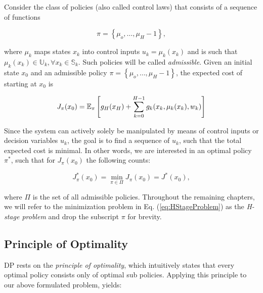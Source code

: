 Consider the class of policies (also called control laws) that consists of a
sequence of functions 

\begin{equation}
  \pi = \left\{\mu_o,\dots,\mu_H-1\right\},
\end{equation}

where $\mu_k$ maps states $x_k$ into control inputs $u_k = \mu_k(x_k)$ and is
such that $\mu_k(x_k) \in \mathbb{U}_k, \forall x_k \in \mathbb{S}_k$. Such
policies will be called \textit{admissible}. Given an initial state $x_0$ and an
admissible policy $\pi = \left\{\mu_o,\dots,\mu_H-1\right\}$, the expected cost
of starting at $x_0$ is

\begin{equation}
  J_\pi(x_0) = \mathbb{E}_\pi\left[g_H(x_H) + \sum\limits_{k=0}^{H-1}{g_k(x_k, \mu_k(x_k), w_k)}\right]
\end{equation}

Since the system can actively solely be manipulated by means of control inputs
or decision variables $u_k$, the goal is to find a sequence of $u_k$, such that
the total expected cost is minimal. In other words, we are interested in an
optimal policy $\pi^*$, such that for $J_\pi(x_0)$ the following counts:

\begin{equation}
  J_\pi^*(x_0) = \min_{\pi\in\Pi}J_\pi(x_0) = J^*(x_0), \label{eq:HStageProblem}
\end{equation}

where $\Pi$ is the set of all admissible policies. Throughout the remaining
chapters, we will refer to the minimization problem in Eq.
(\ref{eq:HStageProblem}) as the \textit{H-stage problem} and drop the subscript
$\pi$ for brevity.

\subsection*{Principle of Optimality}
DP rests on the \textit{principle of optimality}, which intuitively states that
every optimal policy consists only of optimal sub policies. Applying this
principle to our above formulated problem, yields: 

\begin{center}
\end{center}

